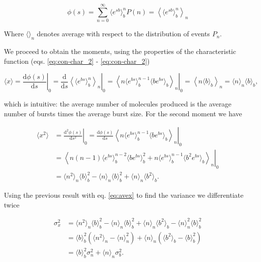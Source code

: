 \begin{equation*}
  \phi(s) = \sum_{n=0}^\infty \langle e^{sb}\rangle_b^n P(n) = \left\langle\langle e^{sb}\rangle_b^n\right\rangle_n
\end{equation*}

Where $\langle \rangle_n$ denotes average with respect to the distribution of events $P_n$.

We proceed to obtain the moments, using the properties of the characteristic function (eqs. \eqref{eq:con-char_2} - \eqref{eq:con-char_2})

\begin{equation}
  \label{eq:avex}
  \langle x\rangle = \left.\frac{\mathrm{d}\phi(s)}{\mathrm{d}s}\right|_0 = \left.\frac{\mathrm{d}}{\mathrm{d}s}\left\langle\langle e^{bs}\rangle_b^n\right\rangle_n\right|_0 = \left.\left\langle n\langle e^{bs}\rangle_b^{n-1}\langle b e^{bs}\rangle_b\right\rangle_n\right|_0 = \left\langle n\langle b\rangle_b\right\rangle_n = \langle n\rangle_n\langle b\rangle_b,
\end{equation}

which is intuitive: the average number of molecules produced is the average number of bursts times the average burst size. For the second moment we have

\begin{equation*}
  \begin{split}
    \langle x^2\rangle &= \left.\frac{\mathrm{d^2}\phi(s)}{\mathrm{d}s^2}\right|_0 = \left.\frac{\mathrm{d}\phi(s)}{\mathrm{d}s}\left\langle n\langle e^{bs}\rangle_b^{n-1}\langle b e^{bs}\rangle_b\right\rangle_n\right|_0\\
  &= \left.\left\langle n(n-1)\langle e^{bs}\rangle^{n-2}_b\langle be^{bs}\rangle^2_b+n\langle e^{bs}\rangle^{n-1}_b\langle b^2e^{bs}\rangle_b\right\rangle_n\right|_0\\
  &=\langle n^2\rangle_n\langle b\rangle_b^2-\langle n\rangle_n\langle b\rangle_b^2+\langle n\rangle_n\langle b^2\rangle_b.
  \end{split}
\end{equation*}

Using the previous result with eq. \eqref{eq:avex} to find the variance we differentiate twice

\begin{equation*}
  \begin{split}
    \sigma_x^2 &= \langle n^2\rangle_n\langle b\rangle_b^2-\langle n\rangle_n\langle b\rangle_b^2+\langle n\rangle_n\langle b^2\rangle_b - \langle n\rangle_n^2\langle b\rangle_b^2\\
    &=\langle b\rangle_b^2\left(\langle n^2\rangle_n-\langle n\rangle^2_n\right) + \langle n\rangle_n\left(\langle b^2\rangle_b-\langle b\rangle_b^2\right)\\
    &=\langle b\rangle_b^2\sigma_n^2 + \langle n\rangle_n\sigma_b^2.
  \end{split}
\end{equation*}

